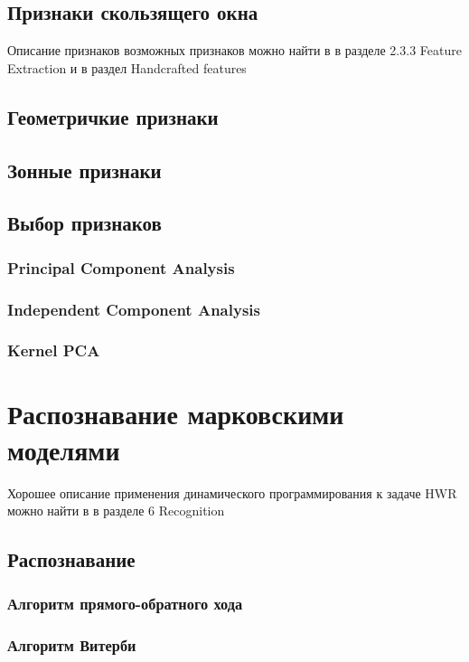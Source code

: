\subsection{Признаки скользящего окна}

Описание признаков возможных признаков можно найти в \cite{vinciarelli2003offline} в разделе 2.3.3 Feature Extraction и в \cite{tay2002offline} раздел Handcrafted features

\subsection{Геометричкие признаки}
\subsection{Зонные признаки}
\subsection{Выбор признаков}
\subsubsection{Principal Component Analysis}
\subsubsection{Independent Component Analysis}
\subsubsection{Kernel PCA}

\section{Распознавание марковскими моделями}

Хорошее описание применения динамического программирования к задаче HWR можно найти в \cite{kim1997lexicon} в разделе 6 Recognition

\subsection{Распознавание}
\subsubsection{Алгоритм прямого-обратного хода}
\subsubsection{Алгоритм Витерби}
